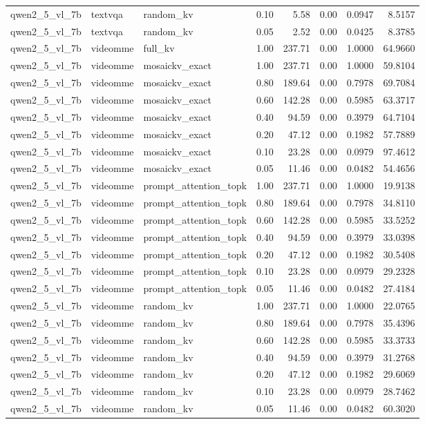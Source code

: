 \begin{longtable}{lllrrrrr}
qwen2\_5\_vl\_7b & textvqa & random\_kv & 0.10 & 5.58 & 0.00 & 0.0947 & 8.5157 \\
qwen2\_5\_vl\_7b & textvqa & random\_kv & 0.05 & 2.52 & 0.00 & 0.0425 & 8.3785 \\
qwen2\_5\_vl\_7b & videomme & full\_kv & 1.00 & 237.71 & 0.00 & 1.0000 & 64.9660 \\
qwen2\_5\_vl\_7b & videomme & mosaickv\_exact & 1.00 & 237.71 & 0.00 & 1.0000 & 59.8104 \\
qwen2\_5\_vl\_7b & videomme & mosaickv\_exact & 0.80 & 189.64 & 0.00 & 0.7978 & 69.7084 \\
qwen2\_5\_vl\_7b & videomme & mosaickv\_exact & 0.60 & 142.28 & 0.00 & 0.5985 & 63.3717 \\
qwen2\_5\_vl\_7b & videomme & mosaickv\_exact & 0.40 & 94.59 & 0.00 & 0.3979 & 64.7104 \\
qwen2\_5\_vl\_7b & videomme & mosaickv\_exact & 0.20 & 47.12 & 0.00 & 0.1982 & 57.7889 \\
qwen2\_5\_vl\_7b & videomme & mosaickv\_exact & 0.10 & 23.28 & 0.00 & 0.0979 & 97.4612 \\
qwen2\_5\_vl\_7b & videomme & mosaickv\_exact & 0.05 & 11.46 & 0.00 & 0.0482 & 54.4656 \\
qwen2\_5\_vl\_7b & videomme & prompt\_attention\_topk & 1.00 & 237.71 & 0.00 & 1.0000 & 19.9138 \\
qwen2\_5\_vl\_7b & videomme & prompt\_attention\_topk & 0.80 & 189.64 & 0.00 & 0.7978 & 34.8110 \\
qwen2\_5\_vl\_7b & videomme & prompt\_attention\_topk & 0.60 & 142.28 & 0.00 & 0.5985 & 33.5252 \\
qwen2\_5\_vl\_7b & videomme & prompt\_attention\_topk & 0.40 & 94.59 & 0.00 & 0.3979 & 33.0398 \\
qwen2\_5\_vl\_7b & videomme & prompt\_attention\_topk & 0.20 & 47.12 & 0.00 & 0.1982 & 30.5408 \\
qwen2\_5\_vl\_7b & videomme & prompt\_attention\_topk & 0.10 & 23.28 & 0.00 & 0.0979 & 29.2328 \\
qwen2\_5\_vl\_7b & videomme & prompt\_attention\_topk & 0.05 & 11.46 & 0.00 & 0.0482 & 27.4184 \\
qwen2\_5\_vl\_7b & videomme & random\_kv & 1.00 & 237.71 & 0.00 & 1.0000 & 22.0765 \\
qwen2\_5\_vl\_7b & videomme & random\_kv & 0.80 & 189.64 & 0.00 & 0.7978 & 35.4396 \\
qwen2\_5\_vl\_7b & videomme & random\_kv & 0.60 & 142.28 & 0.00 & 0.5985 & 33.3733 \\
qwen2\_5\_vl\_7b & videomme & random\_kv & 0.40 & 94.59 & 0.00 & 0.3979 & 31.2768 \\
qwen2\_5\_vl\_7b & videomme & random\_kv & 0.20 & 47.12 & 0.00 & 0.1982 & 29.6069 \\
qwen2\_5\_vl\_7b & videomme & random\_kv & 0.10 & 23.28 & 0.00 & 0.0979 & 28.7462 \\
qwen2\_5\_vl\_7b & videomme & random\_kv & 0.05 & 11.46 & 0.00 & 0.0482 & 60.3020 \\
\end{longtable}
